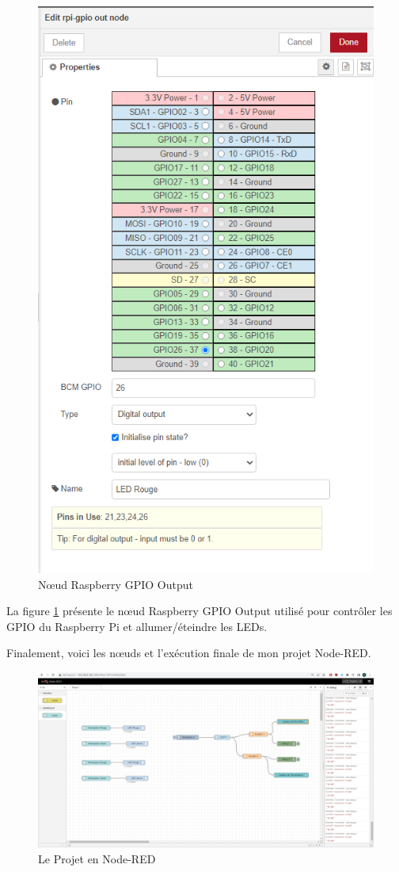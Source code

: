 \begin{figure}[H]
\centering
\includegraphics[width=12cm]{Images/Node-7.png}
\caption{Nœud Raspberry GPIO Output}
\label{Chap4.3.19}
\end{figure}

La figure \ref{Chap4.3.19} présente le nœud Raspberry GPIO Output utilisé pour contrôler les GPIO du Raspberry Pi et allumer/éteindre les LEDs.

Finalement, voici les nœuds et l'exécution finale de mon projet Node-RED.

\begin{figure}[H]
\centering
\includegraphics[width=15cm]{Images/Node-1.png}
\caption{Le Projet en Node-RED}
\label{Chap4.3.20}
\end{figure}

